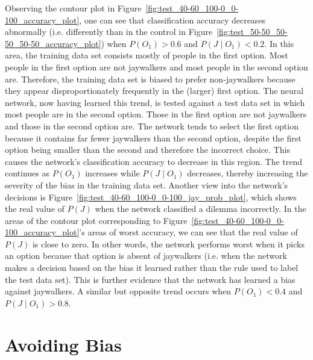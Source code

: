 \documentclass{report}
\begin{document}
Observing the contour plot in Figure~\ref{fig:test_40-60_100-0_0-100_accuracy_plot}, one can see
that classification accuracy decreases abnormally (i.e. differently than in the control in
Figure~\ref{fig:test_50-50_50-50_50-50_accuracy_plot}) when $P(O_1) > 0.6$ and $P(J \mid O_1) <
0.2$. In this area, the training data set consists mostly of people in the first option. Most people
in the first option are not jaywalkers and most people in the second option are. Therefore, the
training data set is biased to prefer non-jaywalkers because they appear disproportionately
frequently in the (larger) first option. The neural network, now having learned this trend, is
tested against a test data set in which most people are in the second option. Those in the first
option are not jaywalkers and those in the second option are. The network tends to select the first
option because it contains far fewer jaywalkers than the second option, despite the first option
being smaller than the second and therefore the incorrect choice. This causes the network's
classification accuracy to decrease in this region. The trend continues as $P(O_1)$ increases while
$P(J \mid O_1)$ decreases, thereby increasing the severity of the bias in the training data set.
Another view into the network's decisions is Figure~\ref{fig:test_40-60_100-0_0-100_jay_prob_plot},
which shows the real value of $P(J)$ when the network classified a dilemma incorrectly. In the areas
of the contour plot corresponding to Figure~\ref{fig:test_40-60_100-0_0-100_accuracy_plot}'s areas
of worst accuracy, we can see that the real value of $P(J)$ is close to zero. In other words, the
network performs worst when it picks an option because that option is absent of jaywalkers (i.e.
when the network makes a decision based on the bias it learned rather than the rule used to label
the test data set). This is further evidence that the network has learned a bias against jaywalkers.
A similar but opposite trend occurs when $P(O_1) < 0.4$ and $P(J \mid O_1) > 0.8$.

\FloatBarrier
\section{Avoiding Bias}
\end{document}
